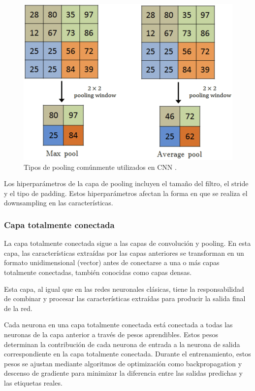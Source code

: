 \begin{figure}[h]
	\centering
	\includegraphics[scale=0.55]{imagenes/cap2/pooling.png}
	\caption{Tipos de pooling comúnmente utilizados en CNN \cite{40}.}
	\label{fig8}
\end{figure}

Los hiperparámetros de la capa de pooling incluyen el tamaño del filtro, el stride y el tipo de padding. Estos hiperparámetros afectan la forma en que se realiza el downsampling en las características.


\subsubsection*{Capa totalmente conectada}

La capa totalmente conectada sigue a las capas de convolución y pooling. En esta capa, las características extraídas por las capas anteriores se transforman en un formato unidimensional (vector) antes de conectarse a una o más capas totalmente conectadas, también conocidas como capas densas.

Esta capa, al igual que en las redes neuronales clásicas, tiene la responsabilidad de combinar y procesar las características extraídas para producir la salida final de la red.

Cada neurona en una capa totalmente conectada está conectada a todas las neuronas de la capa anterior a través de pesos aprendibles. Estos pesos determinan la contribución de cada neurona de entrada a la neurona de salida correspondiente en la capa totalmente conectada. Durante el entrenamiento, estos pesos se ajustan mediante algoritmos de optimización como backpropagation y descenso de gradiente para minimizar la diferencia entre las salidas predichas y las etiquetas reales.

